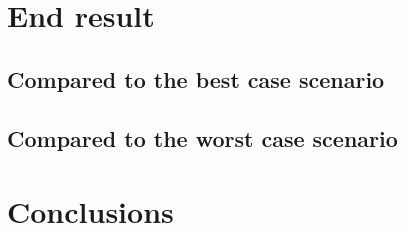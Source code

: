 \documentclass[a4paper,12pt]{article}
\begin{document}
\newpage
\section{End result}
\subsection{Compared to the best case scenario}

\subsection{Compared to the worst case scenario}

\newpage
\section{Conclusions}


\newpage
{}
{}
\listoffigures

\newpage
{}
{}


\end{document}
